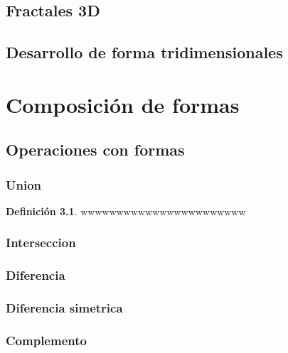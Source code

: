 \documentclass[16pt,]{krantz}
\theoremstyle{definition}
\newtheorem{definition}{Definición}[chapter]
\theoremstyle{definition}
\theoremstyle{definition}
\theoremstyle{definition}
\theoremstyle{remark}
\begin{document}
\hypertarget{fractales-3d}{%
\section{Fractales 3D}\label{fractales-3d}}

\hypertarget{desarrollo-de-forma-tridimensionales}{%
\section{Desarrollo de forma tridimensionales}\label{desarrollo-de-forma-tridimensionales}}

\hypertarget{composiciuxf3n-de-formas}{%
\chapter{Composición de formas}\label{composiciuxf3n-de-formas}}

\hypertarget{operaciones-con-formas}{%
\section{Operaciones con formas}\label{operaciones-con-formas}}

\hypertarget{union}{%
\subsection{Union}\label{union}}

\begin{definition}
\protect\hypertarget{def:unnamed-chunk-1}{}{\label{def:unnamed-chunk-1} }wwwwwwwwwwwwwwwwwwwwwww
\end{definition}

\hypertarget{interseccion}{%
\subsection{Interseccion}\label{interseccion}}

\hypertarget{diferencia}{%
\subsection{Diferencia}\label{diferencia}}

\hypertarget{diferencia-simetrica}{%
\subsection{Diferencia simetrica}\label{diferencia-simetrica}}

\hypertarget{complemento}{%
\subsection{Complemento}\label{complemento}}
\end{document}
